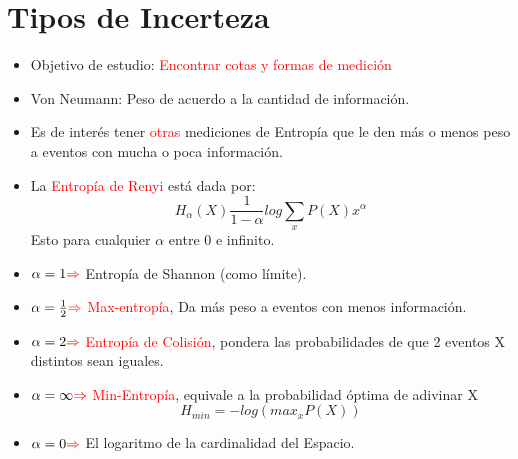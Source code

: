 \documentclass{book}
\begin{document}
\section{Tipos de Incerteza}
\begin{itemize}
    \item Objetivo de estudio: \textcolor{red}{Encontrar cotas y formas de medición}
    \item Von Neumann: Peso de acuerdo a la cantidad de información.
    \item Es de interés tener \textcolor{red}{otras} mediciones de Entropía que le den más o menos peso a eventos con mucha o poca información.
    \item La \textcolor{red}{Entropía de Renyi} está dada por:
    \begin{equation}\label{eq4.6}H_\alpha(X)\frac{1}{1-\alpha} log\sum_x P(X)x^\alpha \end{equation} Esto para cualquier $\alpha$ entre 0 e infinito.
\end{itemize}
\begin{itemize}
    \item $\alpha=1 \textcolor{red}{\Rightarrow}$ Entropía de Shannon (como límite). 
    \item $\alpha=\frac{1}{2} \textcolor{red}{\Rightarrow} $ \textcolor{red}{Max-entropía}, Da más peso a eventos con menos información.
    \item $\alpha=2\textcolor{red}{\Rightarrow}$ \textcolor{red}{Entropía de Colisión}, pondera las probabilidades de que 2 eventos X distintos sean iguales. 
    \item $\alpha=\infty\textcolor{red}{\Rightarrow}$ \textcolor{red}{Min-Entropía}, equivale a la probabilidad óptima de adivinar X
    \begin{equation}\label{eq4.7}H_{min}=-log( max_x P(X))\end{equation}
    \item $\alpha=0 \textcolor{red}{\Rightarrow} $ El logaritmo de la cardinalidad del Espacio. 
\end{itemize}
\end{document}

